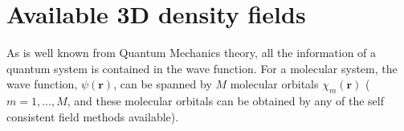 
\chapter{Available 3D density fields}\label{sec:availablefields}

As is well known from Quantum Mechanics theory, all the information of a quantum system is
contained in the wave function. For a molecular system,  the wave function, $\psi(\boldsymbol{r})$,
can be spanned by $M$ molecular orbitals $\chi_m(\boldsymbol{r})$ ($m=1,\dots,M$, and these
molecular orbitals can be obtained by any of the self consistent field methods available).

